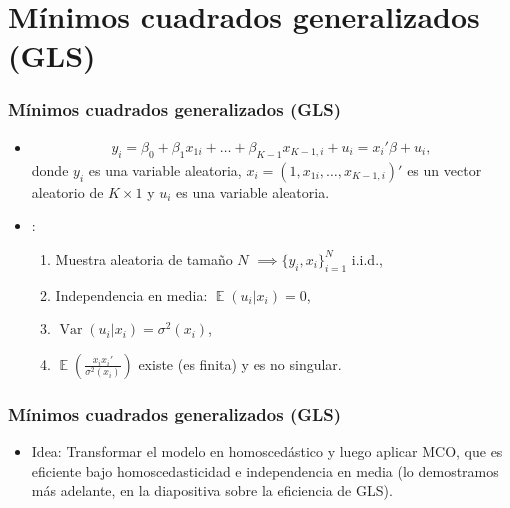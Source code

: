 \documentclass[t, compress, spanish, aspectratio=169]{beamer}
\newcommand{\compactmath}{\setlength{\abovedisplayskip}{3pt}\setlength{\belowdisplayskip}{3pt}\setlength{\abovedisplayshortskip}{0pt}\setlength{\belowdisplayshortskip}{2pt}\setlength{\jot}{1pt}} %
\newcommand{\term}[1]{\structure{\textbf{#1}}} %
\DeclareMathOperator{\Var}{Var}
\DeclareMathOperator{\E}{\mathbb{E}}
\begin{document}
\section{M\'inimos cuadrados generalizados (GLS)}
\begin{frame}\compactmath
    \frametitle{M\'inimos cuadrados generalizados (GLS)}
    \begin{itemize}
    \item []
    \begin{align*}
        y_i=\beta_0 + \beta_1 x_{1i} + \dots+\beta_{K-1}  x_{K-1,i}+u_i = x_i'\beta+u_i,
    \end{align*}
    donde $y_i$ es una variable aleatoria, $x_i=(1,x_{1i},\dots,x_{K-1,i})'$ es un vector aleatorio de $K \times 1$ y $u_i$ es una variable aleatoria.
    \item <2->\term{Supuestos}:
    \begin{enumerate}
        \bigskip
        \item [GLS1] Muestra aleatoria de tama\~no $N$ $\implies \{y_i,x_i\}_{i=1}^N$ i.i.d.,
        \bigskip
        \item [GLS2] Independencia en media: $\E(u_i|x_i)=0$,
        \bigskip
        \item [GLS3] $\Var(u_i|x_i)=\sigma^2(x_i)$,
        \bigskip
        \item [GLS4] $\E \left(\frac{x_ix_i'}{\sigma^2(x_i)}\right)$ existe (es finita) y es no singular.
        \bigskip
    \end{enumerate}
    \end{itemize}
\end{frame}
\begin{frame}
    \frametitle{M\'inimos cuadrados generalizados (GLS)}
    \begin{itemize}
    \item Idea: Transformar el modelo en homosced\'astico y luego aplicar MCO, que es eficiente bajo homoscedasticidad e independencia en media (lo demostramos m\'as adelante, en la diapositiva sobre la eficiencia de GLS).
    \end{itemize}
\end{frame}

\end{document}
